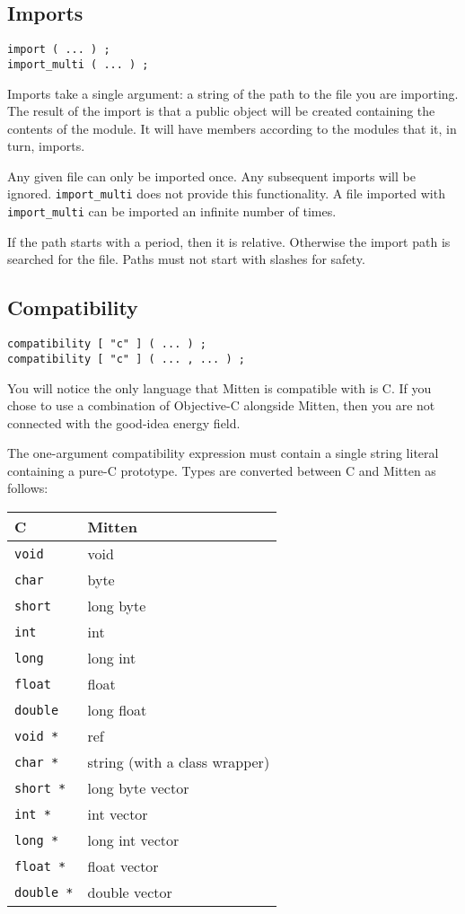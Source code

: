\documentclass[10pt,a4paper]{article}
\begin{document}
\subsection{Imports}
\label{sec:imports}
\begin{verbatim}
import ( ... ) ;
import_multi ( ... ) ;
\end{verbatim}

Imports take a single argument: a string of the path to the file you are importing. The result of the import is that a public object will be created containing the contents of the module. It will have members according to the modules that it, in turn, imports.

Any given file can only be imported once. Any subsequent imports will be ignored. \verb|import_multi| does not provide this functionality. A file imported with \verb|import_multi| can be imported an infinite number of times.

If the path starts with a period, then it is relative. Otherwise the import path is searched for the file. Paths must not start with slashes for safety.

\subsection{Compatibility}
\label{sec:compatibilityExpressions}
\begin{verbatim}
compatibility [ "c" ] ( ... ) ;
compatibility [ "c" ] ( ... , ... ) ;
\end{verbatim}

You will notice the only language that Mitten is compatible with is C. If you chose to use a combination of Objective-C alongside Mitten, then you are not connected with the good-idea energy field.

The one-argument compatibility expression must contain a single string literal containing a pure-C prototype. Types are converted between C and Mitten as follows:

\begin{tabular}{l l}
C & Mitten \\
\hline
\verb|void| & void \\
\verb|char| & byte \\
\verb|short| & long byte \\
\verb|int| & int \\
\verb|long| & long int \\
\verb|float| & float \\
\verb|double| & long float \\
\verb|void *| & ref \\
\verb|char *| & string (with a class wrapper) \\
\verb|short *| & long byte vector \\
\verb|int *| & int vector \\
\verb|long *| & long int vector \\
\verb|float *| & float vector \\
\verb|double *| & double vector \\
\end{tabular}
\end{document}
